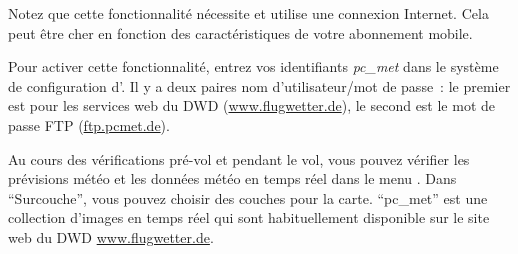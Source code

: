 Notez que cette fonctionnalité nécessite et utilise une connexion Internet.
Cela peut être cher en fonction des caractéristiques de votre abonnement mobile.

Pour activer cette fonctionnalité, entrez vos identifiants \emph{pc\_met} dans le système de configuration d'\xc.
Il y a deux paires nom d'utilisateur/mot de passe~: le premier est pour les services web du DWD (\url{www.flugwetter.de}), le second est le mot de passe FTP (\url{ftp.pcmet.de}).

Au cours des vérifications pré-vol et pendant le vol, vous pouvez vérifier les prévisions météo et les données météo en temps réel dans le menu .
Dans ``Surcouche'', vous pouvez choisir des couches pour la carte.
``pc\_met'' est une collection d'images en temps réel qui sont habituellement disponible sur le site web du DWD \url{www.flugwetter.de}.
